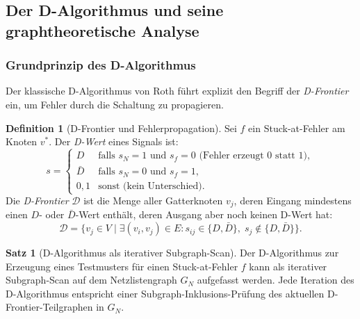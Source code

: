 ﻿\documentclass[a4paper,12pt]{article}
\theoremstyle{definition}
\newtheorem{definition}{Definition}
\newtheorem{satz}{Satz}
\begin{document}
\subsection{Der D-Algorithmus und seine graphtheoretische Analyse}

\subsubsection{Grundprinzip des D-Algorithmus}

Der klassische D-Algorithmus von Roth \cite[S.~823]{ciletti2011} führt explizit den
Begriff der \emph{D-Frontier} ein, um Fehler durch die Schaltung zu propagieren.

\begin{definition}[D-Frontier und Fehlerpropagation]\label{def:dfrontier}
  Sei $f$ ein Stuck-at-Fehler am Knoten $v^*$. Der \emph{D-Wert} eines Signals ist:
  \[
    s = \begin{cases}
      D   & \text{falls } s_N = 1 \text{ und } s_f = 0 \text{ (Fehler erzeugt 0 statt 1)}, \\
      \bar{D} & \text{falls } s_N = 0 \text{ und } s_f = 1,\\
      0, 1 & \text{sonst (kein Unterschied)}.
    \end{cases}
  \]
  Die \emph{D-Frontier} $\mathcal{D}$ ist die Menge aller Gatterknoten $v_j$, deren
  Eingang mindestens einen $D$- oder $\bar{D}$-Wert enthält, deren Ausgang aber noch
  keinen D-Wert hat:
  \[
    \mathcal{D} = \bigl\{v_j \in V \;\big|\;
    \exists (v_i, v_j) \in E: s_{ij} \in \{D, \bar{D}\},\;
    s_j \notin \{D, \bar{D}\}\bigr\}.
  \]
\end{definition}

\begin{satz}[D-Algorithmus als iterativer Subgraph-Scan]\label{satz:dalgo}
  Der D-Algorithmus \cite[S.~823--829]{ciletti2011} zur Erzeugung eines Testmusters für
  einen Stuck-at-Fehler $f$ kann als iterativer Subgraph-Scan auf dem Netzlistengraph
  $G_N$ aufgefasst werden. Jede Iteration des D-Algorithmus entspricht einer
  Subgraph-Inklusions-Prüfung des aktuellen D-Frontier-Teilgraphen in $G_N$.
\end{satz}
\end{document}
